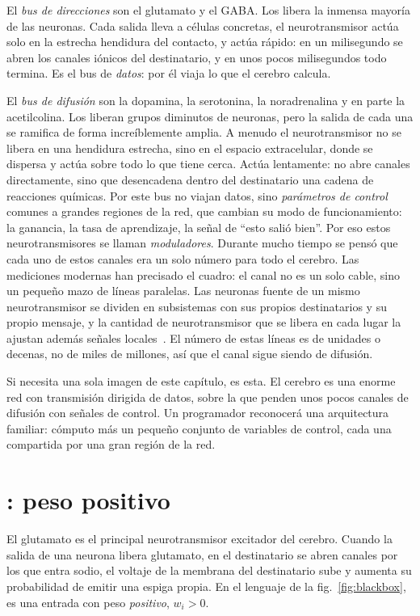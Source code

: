 El \emph{bus de direcciones} son el glutamato y el GABA. Los libera la inmensa mayoría de las neuronas. Cada salida lleva a células concretas, el neurotransmisor actúa solo en la estrecha hendidura del contacto, y actúa rápido: en un milisegundo se abren los canales iónicos del destinatario, y en unos pocos milisegundos todo termina. Es el bus de \emph{datos}: por él viaja lo que el cerebro calcula.

El \emph{bus de difusión} son la dopamina, la serotonina, la noradrenalina y en parte la acetilcolina. Los liberan grupos diminutos de neuronas, pero la salida de cada una se ramifica de forma increíblemente amplia. A menudo el neurotransmisor no se libera en una hendidura estrecha, sino en el espacio extracelular, donde se dispersa y actúa sobre todo lo que tiene cerca. Actúa lentamente: no abre canales directamente, sino que desencadena dentro del destinatario una cadena de reacciones químicas. Por este bus no viajan datos, sino \emph{parámetros de control} comunes a grandes regiones de la red, que cambian su modo de funcionamiento: la ganancia, la tasa de aprendizaje, la señal de “esto salió bien”. Por eso estos neurotransmisores se llaman \emph{moduladores}. Durante mucho tiempo se pensó que cada uno de estos canales era un solo número para todo el cerebro. Las mediciones modernas han precisado el cuadro: el canal no es un solo cable, sino un pequeño mazo de líneas paralelas. Las neuronas fuente de un mismo neurotransmisor se dividen en subsistemas con sus propios destinatarios y su propio mensaje, y la cantidad de neurotransmisor que se libera en cada lugar la ajustan además señales locales~\cite{Ren2018,Poe2020}. El número de estas líneas es de unidades o decenas, no de miles de millones, así que el canal sigue siendo de difusión.

Si necesita una sola imagen de este capítulo, es esta. El cerebro es una enorme red con transmisión dirigida de datos, sobre la que penden unos pocos canales de difusión con señales de control. Un programador reconocerá una arquitectura familiar: cómputo más un pequeño conjunto de variables de control, cada una compartida por una gran región de la red.

\section{: peso positivo}

El glutamato es el principal neurotransmisor excitador del cerebro. Cuando la salida de una neurona libera glutamato, en el destinatario se abren canales por los que entra sodio, el voltaje de la membrana del destinatario sube y aumenta su probabilidad de emitir una espiga propia. En el lenguaje de la fig.~\ref{fig:blackbox}, es una entrada con peso \emph{positivo}, $w_i>0$.

